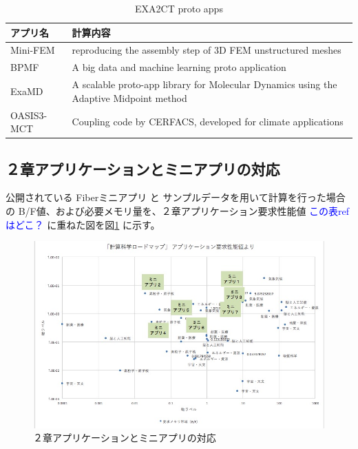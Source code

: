 \begin{table}[H]
\caption{EXA2CT proto apps}
\label{tab:exa2ct-proto-apps}
{
\begin{tabular}{p{50mm}|p{100mm}} \hline
アプリ名		&	計算内容 \\ \hline
\hline
Mini-FEM & reproducing the assembly step of 3D FEM unstructured meshes \\ \hline
BPMF	& A big data and machine learning proto application \\ \hline
ExaMD	& A scalable proto-app library for Molecular Dynamics using
			the Adaptive Midpoint method  \\ \hline
OASIS3-MCT & Coupling code by CERFACS, developed for climate applications
\\ \hline
\end{tabular}
}
\end{table}


%	
%	


\subsection{２章アプリケーションとミニアプリの対応}
\label{sec:apps-and-miniapps}

公開されている Fiberミニアプリ と サンプルデータを用いて計算を行った場合の
B/F値、および必要メモリ量を、２章アプリケーション要求性能値
{\textcolor{blue}{この表refはどこ？}} %
に重ねた図を図\ref{fig:apps-miniapps} に示す。

\begin{figure}[h]
\includegraphics[width=\textwidth]{figs/3-2-miniapps.jpg}
\caption{２章アプリケーションとミニアプリの対応}
\label{fig:apps-miniapps}
\end{figure}


